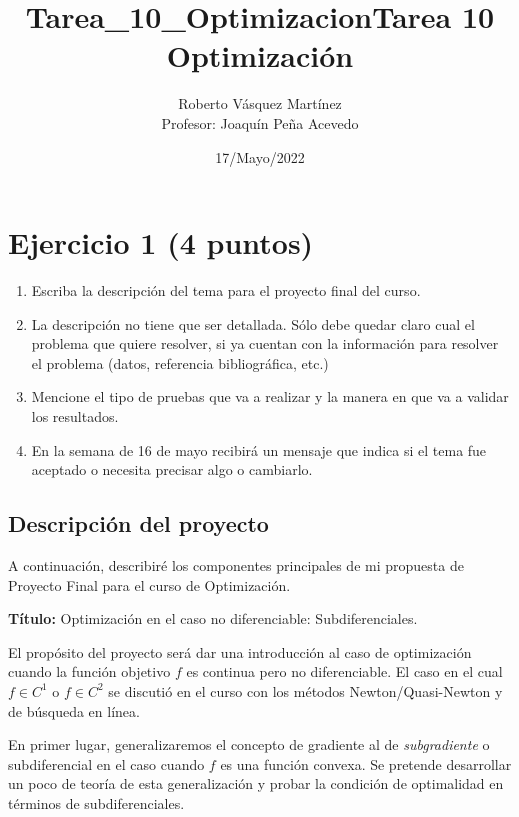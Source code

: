 \documentclass[11pt]{article}
\title{Tarea\_10\_Optimizacion}
\providecommand{\tightlist}{%
      \setlength{\itemsep}{0pt}\setlength{\parskip}{0pt}}
\begin{document}
    
\title{Tarea 10 Optimización}
\author{Roberto Vásquez Martínez \\ Profesor: Joaquín Peña Acevedo}
\date{17/Mayo/2022}
\maketitle 
    
    

    
    \hypertarget{ejercicio-1-4-puntos}{%
\section{Ejercicio 1 (4 puntos)}\label{ejercicio-1-4-puntos}}

\begin{enumerate}
\def\labelenumi{\arabic{enumi}.}
\tightlist
\item
  Escriba la descripción del tema para el proyecto final del curso.
\item
  La descripción no tiene que ser detallada. Sólo debe quedar claro cual
  el problema que quiere resolver, si ya cuentan con la información para
  resolver el problema (datos, referencia bibliográfica, etc.)
\item
  Mencione el tipo de pruebas que va a realizar y la manera en que va a
  validar los resultados.
\item
  En la semana de 16 de mayo recibirá un mensaje que indica si el tema
  fue aceptado o necesita precisar algo o cambiarlo.
\end{enumerate}

    \hypertarget{descripciuxf3n-del-proyecto}{%
\subsection{Descripción del
proyecto}\label{descripciuxf3n-del-proyecto}}

A continuación, describiré los componentes principales de mi propuesta
de Proyecto Final para el curso de Optimización.

\textbf{Título:} Optimización en el caso no diferenciable:
Subdiferenciales.

El propósito del proyecto será dar una introducción al caso de
optimización cuando la función objetivo \(f\) es continua pero no
diferenciable. El caso en el cual \(f\in C^1\) o \(f\in C^2\) se
discutió en el curso con los métodos Newton/Quasi-Newton y de búsqueda
en línea.

En primer lugar, generalizaremos el concepto de gradiente al de
\emph{subgradiente} o subdiferencial en el caso cuando \(f\) es una
función convexa. Se pretende desarrollar un poco de teoría de esta
generalización y probar la condición de optimalidad en términos de
subdiferenciales.
\end{document}
